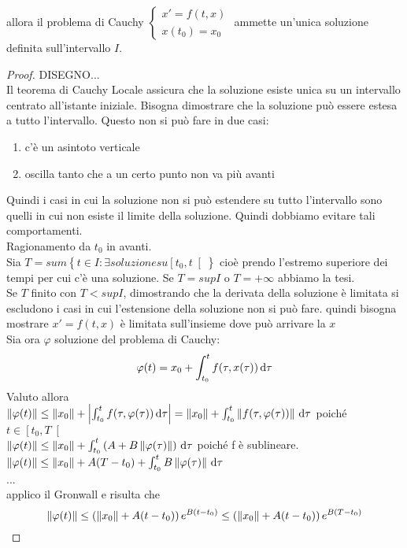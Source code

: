 allora il problema di Cauchy $\left\{\begin{matrix} x'=f(t,x)\\x(t_0)=x_0\end{matrix}\right.$ ammette un'unica soluzione definita sull'intervallo $I$.
\begin{proof}
	DISEGNO...\\
	Il teorema di Cauchy Locale assicura che  la soluzione esiste unica su un intervallo centrato all'istante iniziale.
	Bisogna dimostrare che la soluzione può essere estesa a tutto l'intervallo. Questo non si può fare in due casi:
	\begin{enumerate}
		\item c'è un asintoto verticale
		\item oscilla tanto che a un certo punto non va più avanti
	\end{enumerate}
	Quindi i casi in cui la soluzione non si può estendere su tutto l'intervallo sono quelli in cui non esiste il limite della soluzione. Quindi dobbiamo evitare tali comportamenti.\\
	Ragionamento da $t_0$ in avanti.\\
	Sia $T=sum\left\{t\in I :\exists soluzione su \left[ t_0,t \right[ \right\}$ cioè prendo l'estremo superiore dei tempi per cui c'è una soluzione.
	Se $T= sup I$ o $T=+\infty$ abbiamo la tesi.\\
	Se $T$ finito con $T<sup I$, dimostrando che la derivata della soluzione è limitata si escludono i casi in cui l'estensione della soluzione non si può fare.
	quindi bisogna mostrare $ x' = f(t,x)$ è limitata sull'insieme dove può arrivare la $x$\\
	Sia ora $\varphi$ soluzione del problema di Cauchy:
	$$ \varphi(t) = x_0 + \int_{t_0}^tf(\tau,x(\tau))\,\mathrm{d}{\tau}$$
	Valuto allora\\
	$\left\|\varphi(t)\right\|\le \left\|x_0\right\| + \left|\int_{t_0}^tf(\tau,\varphi(\tau))\,\mathrm{d}{\tau}\right|=\left\|x_0\right\| + \int_{t_0}^t\left\|f(\tau,\varphi(\tau))\right\|\,\mathrm{d}{\tau}$ poiché $t\in\left[t_0,T\right[$\\
	$\left\|\varphi(t)\right\|\le \left\|x_0\right\| + \int_{t_0}^t\left(A+B\left\|\varphi(\tau)\right\|\right)\,\mathrm{d}{\tau}$ poiché f è sublineare.\\
	$\left\|\varphi(t)\right\|\le \left\|x_0\right\| + A(T-t_0)+\int_{t_0}^t B\left\|\varphi(\tau)\right\|\,\mathrm{d}{\tau}$\\
	...\\
	applico il Gronwall e risulta che
	$$\left\|\varphi(t)\right\|\le\left(\left\|x_0\right\|+A(t-t_0)\right)e^{B(t-t_0)}\le\left(\left\|x_0\right\|+A(t-t_0)\right)e^{B(T-t_0)}$$	

\end{proof}

